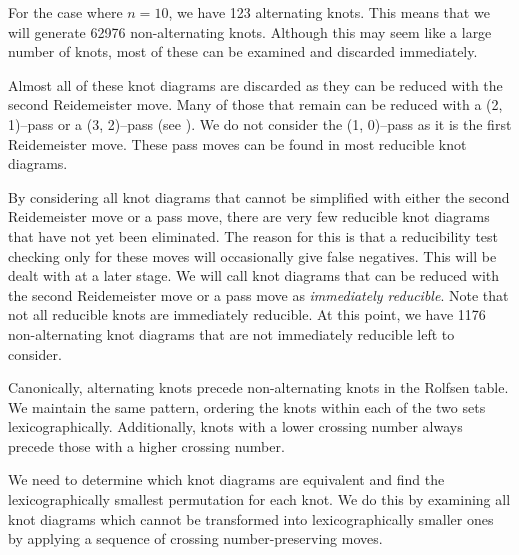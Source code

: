 \begin{paper}
For the case where $n=10$, we have 123 alternating knots.
This means that we will generate 62976 non-alternating knots.
Although this may seem like a large number of knots, most of these can be
examined and discarded immediately.

Almost all of these knot diagrams are discarded as they can be reduced with the
second Reidemeister move.
Many of those that remain can be reduced with a (2, 1)--pass or a (3, 2)--pass
(see \figMoves).
We do not consider the (1, 0)--pass as it is the first Reidemeister move.
These pass moves can be found in most reducible knot diagrams.



\noindent{}

By considering all knot diagrams that cannot be simplified with either the
second Reidemeister move or a pass move, there are very few reducible knot
diagrams that have not yet been eliminated.
The reason for this is that a reducibility test checking only for these moves
will occasionally give false negatives.
This will be dealt with at a later stage.
We will call knot diagrams that can be reduced with the second Reidemeister move
or a pass move as \textit{immediately reducible}.
Note that not all reducible knots are immediately reducible.
At this point, we have 1176 non-alternating knot diagrams that are not
immediately reducible left to consider.



Canonically, alternating knots precede non-alternating knots in the Rolfsen
table.
We maintain the same pattern, ordering the knots within each of the two sets
lexicographically.
Additionally, knots with a lower crossing number always precede those with a
higher crossing number.


We need to determine which knot diagrams are equivalent and find the
lexicographically smallest permutation for each knot.
We do this by examining all knot diagrams which cannot be transformed into
lexicographically smaller ones by applying a sequence of crossing
number-preserving moves.


\end{paper}
